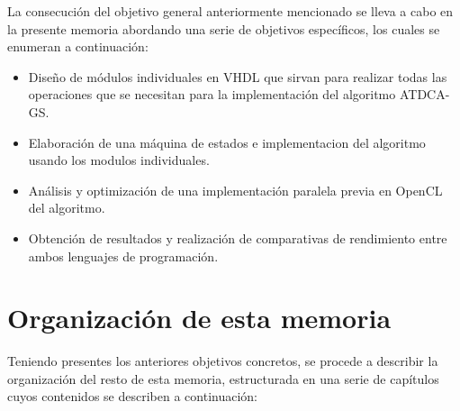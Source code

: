 La consecución del objetivo general anteriormente mencionado se lleva a cabo en la presente memoria abordando una serie de objetivos específicos, los cuales se enumeran a continuación:

\begin{itemize}
    \item Diseño de módulos individuales en VHDL que sirvan para realizar todas las operaciones que se necesitan para la implementación del algoritmo ATDCA-GS.
    \item Elaboración de una máquina de estados e implementacion del algoritmo usando los modulos individuales.
    \item Análisis y optimización de una implementación paralela previa en OpenCL del algoritmo.
    \item Obtención de resultados y realización de comparativas de rendimiento entre ambos lenguajes de programación.
\end{itemize}






\section{Organización de esta memoria}

Teniendo presentes los anteriores objetivos concretos, se procede a describir la organización del resto de esta memoria, estructurada en una serie de capítulos cuyos contenidos se describen a continuación:

